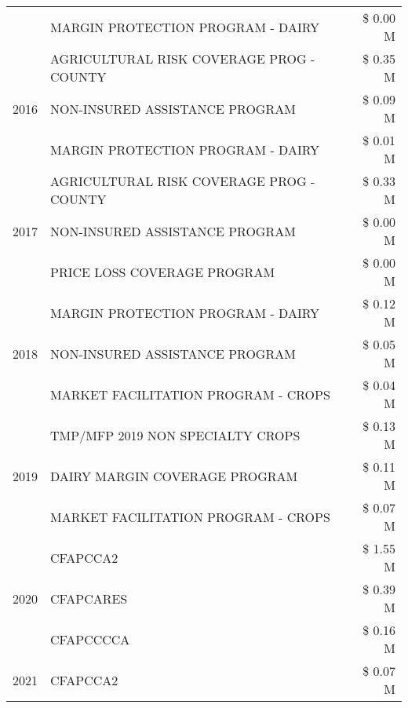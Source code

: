 \begin{tabular}{llr}
 & MARGIN PROTECTION PROGRAM - DAIRY & \$ 0.00 M \\
\cline{1-3}
\multirow[t]{3}{*}{2016} & AGRICULTURAL RISK COVERAGE PROG - COUNTY & \$ 0.35 M \\
 & NON-INSURED ASSISTANCE PROGRAM & \$ 0.09 M \\
 & MARGIN PROTECTION PROGRAM - DAIRY & \$ 0.01 M \\
\cline{1-3}
\multirow[t]{3}{*}{2017} & AGRICULTURAL RISK COVERAGE PROG - COUNTY & \$ 0.33 M \\
 & NON-INSURED ASSISTANCE PROGRAM & \$ 0.00 M \\
 & PRICE LOSS COVERAGE PROGRAM & \$ 0.00 M \\
\cline{1-3}
\multirow[t]{3}{*}{2018} & MARGIN PROTECTION PROGRAM - DAIRY & \$ 0.12 M \\
 & NON-INSURED ASSISTANCE PROGRAM & \$ 0.05 M \\
 & MARKET FACILITATION PROGRAM - CROPS & \$ 0.04 M \\
\cline{1-3}
\multirow[t]{3}{*}{2019} & TMP/MFP 2019 NON SPECIALTY CROPS & \$ 0.13 M \\
 & DAIRY MARGIN COVERAGE PROGRAM & \$ 0.11 M \\
 & MARKET FACILITATION PROGRAM - CROPS & \$ 0.07 M \\
\cline{1-3}
\multirow[t]{3}{*}{2020} & CFAPCCA2 & \$ 1.55 M \\
 & CFAPCARES & \$ 0.39 M \\
 & CFAPCCCCA & \$ 0.16 M \\
\cline{1-3}
2021 & CFAPCCA2 & \$ 0.07 M \\
\cline{1-3}
\bottomrule
\end{tabular}
